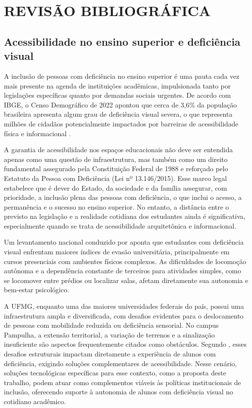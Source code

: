 \chapter{\textbf{REVISÃO BIBLIOGRÁFICA}}
\section{\textbf{Acessibilidade no ensino superior e deficiência visual}}
 A inclusão de pessoas com deficiência no ensino superior é uma pauta cada vez mais presente na agenda de instituições acadêmicas, impulsionada tanto por legislações específicas quanto por demandas sociais urgentes. De acordo com IBGE, o Censo Demográfico de 2022 apontou que cerca de 3,6\% da população brasileira apresenta algum grau de deficiência visual severa, o que representa milhões de cidadãos potencialmente impactados por barreiras de acessibilidade física e informacional \cite{IBGE2023}.

 A garantia de acessibilidade nos espaços educacionais não deve ser entendida apenas como uma questão de infraestrutura, mas também como um direito fundamental assegurado pela Constituição Federal de 1988 e reforçado pelo Estatuto da Pessoa com Deficiência (Lei nº 13.146/2015). Esse marco legal estabelece que é dever do Estado, da sociedade e da família assegurar, com prioridade, a inclusão plena das pessoas com deficiência, o que inclui o acesso, a permanência e o sucesso no ensino superior. No entanto, a distância entre o previsto na legislação e a realidade cotidiana dos estudantes ainda é significativa, especialmente quando se trata de acessibilidade arquitetônica e informacional.

 Um levantamento nacional conduzido por  aponta que estudantes com deficiência visual enfrentam maiores índices de evasão universitária, principalmente em cursos presenciais com ambientes físicos complexos. As dificuldades de locomoção autônoma e a dependência constante de terceiros para atividades simples, como se locomover entre prédios ou localizar salas, afetam diretamente sua autonomia e bem-estar psicológico.

 A UFMG, enquanto uma das maiores universidades federais do país, possui uma infraestrutura ampla e diversificada, com desafios evidentes para o deslocamento de pessoas com mobilidade reduzida ou deficiência sensorial. No campus Pampulha, a extensão territorial, a variação de terrenos e a sinalização insuficiente são aspectos frequentemente citados como obstáculos. Segundo , esses desafios estruturais impactam diretamente a experiência de alunos com deficiência, exigindo soluções complementares de acessibilidade. Nesse cenário, soluções tecnológicas específicas para esse contexto, como a proposta deste trabalho, podem atuar como complementos viáveis às políticas institucionais de inclusão, oferecendo suporte à autonomia de alunos com deficiência visual no cotidiano acadêmico.

